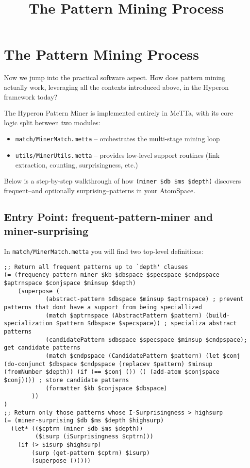 \documentclass{article}
\title{The Pattern Mining Process}
\begin{document}
\section{The Pattern Mining Process}

Now we jump into the practical software aspect.   How does pattern mining actually work, leveraging all the contexts introduced above, in the Hyperon framework today?

The Hyperon Pattern Miner is implemented entirely in MeTTa, with its core logic split between two modules:

\begin{itemize}
  \item \texttt{match/MinerMatch.metta} -- orchestrates the multi-stage mining loop
  \item \texttt{utils/MinerUtils.metta} -- provides low-level support routines (link extraction, counting, surprisingness, etc.)
\end{itemize}

Below is a step-by-step walkthrough of how \texttt{(miner \$db \$ms \$depth)} discovers frequent--and optionally surprising--patterns in your AtomSpace.

\subsection{Entry Point: frequent-pattern-miner and miner-surprising}

In \texttt{match/MinerMatch.metta} you will find two top-level definitions:

\begin{verbatim}
;; Return all frequent patterns up to `depth' clauses
(= (frequency-pattern-miner $kb $dbspace $specspace $cndpspace $aptrnspace $conjspace $minsup $depth)
    (superpose (
            (abstract-pattern $dbspace $minsup $aptrnspace) ; prevent patterns that dont have a support from being speciallized
            (match $aptrnspace (AbstractPattern $pattern) (build-specialization $pattern $dbspace $specspace)) ; specializa abstract patterns
            (candidatePattern $dbspace $specspace $minsup $cndpspace); get candidate patterns
            (match $cndpspace (CandidatePattern $pattern) (let $conj (do-conjunct $dbspace $cndpspace (replacev $pattern) $minsup (fromNumber $depth)) (if (== $conj ()) () (add-atom $conjspace $conj)))) ; store candidate patterns
            (formatter $kb $conjspace $dbspace)
        ))
)
;; Return only those patterns whose I-Surprisingness > highsurp
(= (miner-surprising $db $ms $depth $highsurp)
  (let* (($cptrn (miner $db $ms $depth))
         ($isurp (iSurprisingness $cptrn)))
    (if (> $isurp $highsurp)
        (surp (get-pattern $cptrn) $isurp)
        (superpose ()))))
\end{verbatim}
\end{document}
